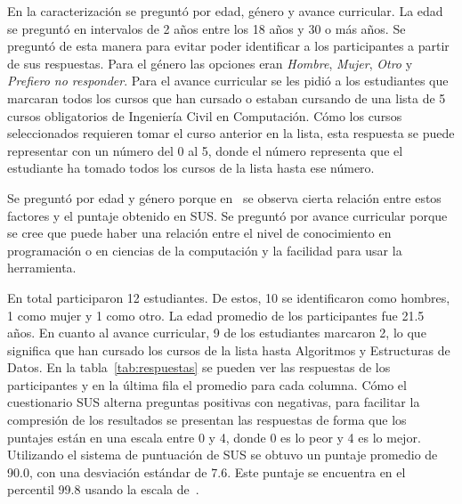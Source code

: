 En la caracterización se preguntó por edad, género y avance curricular. La edad se preguntó en intervalos de 2 años entre los 18 años y 30 o más años. Se preguntó de esta manera para evitar poder identificar a los participantes a partir de sus respuestas. Para el género las opciones eran \textit{Hombre}, \textit{Mujer}, \textit{Otro} y \textit{Prefiero no responder}. Para el avance curricular se les pidió a los estudiantes que marcaran todos los cursos que han cursado o estaban cursando de una lista de 5 cursos obligatorios de Ingeniería Civil en Computación. Cómo los cursos seleccionados requieren tomar el curso anterior en la lista, esta respuesta se puede representar con un número del 0 al 5, donde el número representa que el estudiante ha tomado todos los cursos de la lista hasta ese número.

Se preguntó por edad y género porque en~\cite{evaluation-of-sus} se observa cierta relación entre estos factores y el puntaje obtenido en SUS. Se preguntó por avance curricular porque se cree que puede haber una relación entre el nivel de conocimiento en programación o en ciencias de la computación y la facilidad para usar la herramienta.

En total participaron 12 estudiantes. De estos, 10 se identificaron como hombres, 1 como mujer y 1 como otro. La edad promedio de los participantes fue 21.5 años. En cuanto al avance curricular, 9 de los estudiantes marcaron 2, lo que significa que han cursado los cursos de la lista hasta Algoritmos y Estructuras de Datos. En la tabla~\ref{tab:respuestas} se pueden ver las respuestas de los participantes y en la última fila el promedio para cada columna. Cómo el cuestionario SUS alterna preguntas positivas con negativas, para facilitar la compresión de los resultados se presentan las respuestas de forma que los puntajes están en una escala entre 0 y 4, donde 0 es lo peor y 4 es lo mejor. Utilizando el sistema de puntuación de SUS se obtuvo un puntaje promedio de 90.0, con una desviación estándar de 7.6. Este puntaje se encuentra en el percentil 99.8 usando la escala de~\cite{quantifying-the-user-experience}.

